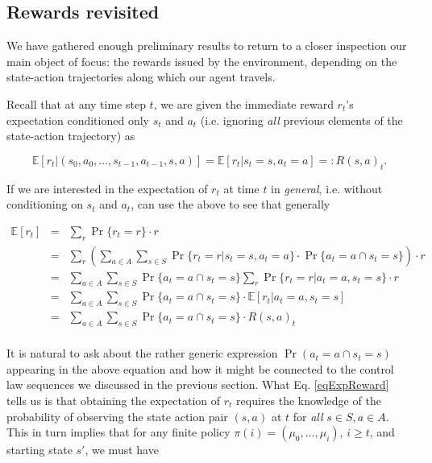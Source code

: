 \documentclass[11pt]{article} %
\begin{document}
\subsection{Rewards revisited}

We have gathered enough preliminary results to return to a closer inspection our main object of focus: the rewards issued by the environment, depending on the state-action trajectories along which our agent travels.

Recall that at any time step $t$, we are given the immediate reward $r_t$'s expectation conditioned only $s_t$ and $a_t$ (i.e. ignoring \textit{all} previous elements of the state-action trajectory) as

\begin{equation}
	\mathbb{E}[r_t | (s_0,a_0,\dots,s_{t-1},a_{t-1},s,a)] = \mathbb{E}[r_t | s_t = s, a_t = a] =: R(s,a)_t.
\end{equation}

If we are interested in the expectation of $r_t$ at time $t$ in \textit{general}, i.e. without conditioning on $s_t$ and $a_t$, can use the above to see that generally

\begin{equation}\label{eqExpReward}
	\begin{array}{rcl}
		\mathbb{E}[r_t]	& = &	\sum\limits_r \Pr\{r_t = r\} \cdot r \\
					& = & 	\sum\limits_r \left(\sum\limits_{a \in A} \sum\limits_{s \in S} \Pr\{r_t = r | s_t = s, a_t = a\} \cdot \Pr\{ a_t = a \cap s_t = s \} \right) \cdot r \\
					& = &	\sum\limits_{a \in A} \sum\limits_{s \in S} \Pr \{a_t = a \cap s_t = s\} \sum\limits_r \Pr \{r_t = r | a_t = a, s_t = s\} \cdot r \\
					& = &	\sum\limits_{a \in A} \sum\limits_{s \in S} \Pr \{a_t = a \cap s_t = s\} \cdot \mathbb{E}[r_t | a_t = a, s_t = s] \\
					& = &	\sum\limits_{a \in A} \sum\limits_{s \in S} \Pr \{a_t = a \cap s_t = s\} \cdot R(s,a)_t \\
	\end{array}
\end{equation}

It is natural to ask about the rather generic expression $\Pr(a_t = a \cap s_t = s)$ appearing in the above equation and how it might be connected to the control law sequences we discussed in the previous section. What Eq. \ref{eqExpReward} tells us is that obtaining the expectation of $r_t$ requires the knowledge of the probability of observing the state action pair $(s,a)$ at $t$ for \textit{all} $s \in S, a \in A$. This in turn implies that for any finite policy $\pi(i) = (\mu_0,\dots,\mu_i)$, $i \ge t$, and starting state $s'$, we must have 
\end{document}
